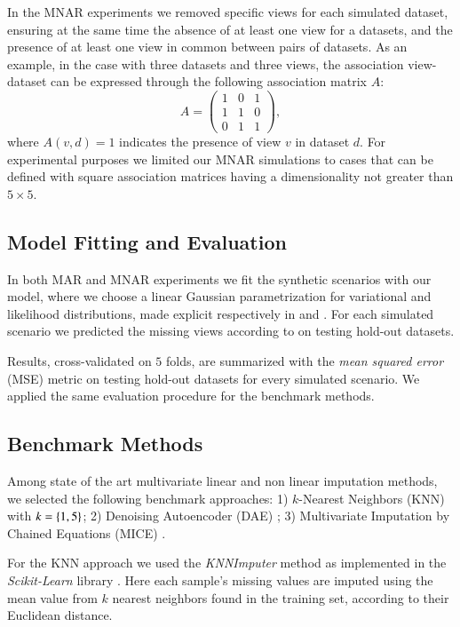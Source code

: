In the MNAR experiments we removed specific views for each simulated dataset, ensuring at the same time the absence of at least one view for a datasets, and the presence of at least one view in common between pairs of datasets.
As an example, in the case with three datasets and three views, the association view-dataset can be expressed through the following association matrix $A$:
\begin{equation}
A = 
\begin{pmatrix}
1 & 0 & 1 \\
1 & 1 & 0 \\
0 & 1 & 1 
\end{pmatrix},
\end{equation}
where $A(v,d)=1$ indicates the presence of view $v$ in dataset $d$.
For experimental purposes we limited our MNAR simulations to cases that can be defined with square association matrices having a dimensionality not greater than $5\times5$.

\subsection{Model Fitting and Evaluation}
In both MAR and MNAR experiments we fit the synthetic scenarios with our model, where we choose a linear Gaussian parametrization for variational and likelihood distributions, made explicit respectively in  and .
For each simulated scenario we predicted the missing views according to  on testing hold-out datasets.

Results, cross-validated on $5$ folds, are summarized with the \textit{mean squared error} (MSE) metric on testing hold-out datasets for every simulated scenario.
We applied the same evaluation procedure for the benchmark methods.

\subsection{Benchmark Methods}
Among state of the art multivariate linear and non linear imputation methods, we selected the following benchmark approaches:
1) $k$-Nearest Neighbors (KNN) with $k=\left\{1, 5\right\}$;
2) Denoising Autoencoder (DAE) \citep{Vincent2008};
3) Multivariate Imputation by Chained Equations (MICE) \citep{Vanbuuren2000}.

For the KNN approach we used the \textit{KNNImputer} method as implemented in the \textit{Scikit-Learn} library \citep{sklearn}.
Here each sample's missing values are imputed using the mean value from $k$ nearest neighbors found in the training set, according to their Euclidean distance.

